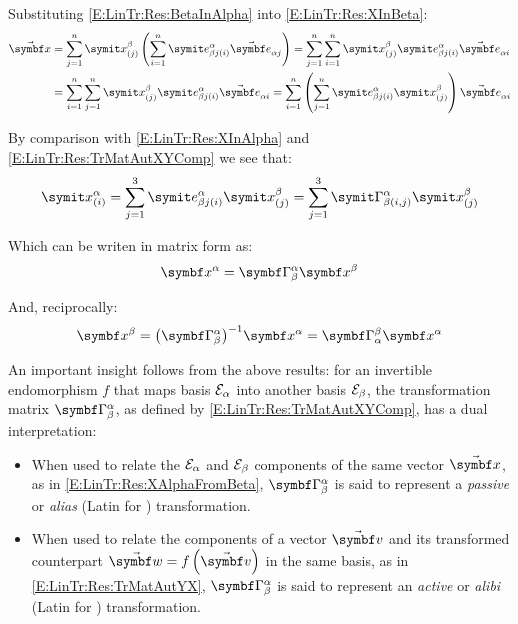Substituting \eqref{E:LinTr:Res:BetaInAlpha} into \eqref{E:LinTr:Res:XInBeta}:
\begin{equation}
\begin{split}
\vabs{x} 	&=\sum_{j=1}^{n} \cprj{x}{\beta}{j} \rndp{\sum_{i=1}^{n} \csubprj{\bv}{\beta j}{\alpha}{i} \vasub{\bv}{\alpha j} } = \sum_{j=1}^{n} \sum_{i=1}^{n}  \cprj{x}{\beta}{j} \csubprj{\bv}{\beta j}{\alpha}{i} \vasub{\bv}{\alpha i} \\
		&=\sum_{i=1}^{n} \sum_{j=1}^{n}  \cprj{x}{\beta}{j} \csubprj{\bv}{\beta j}{\alpha}{i} \vasub{\bv}{\alpha i}  = \sum_{i=1}^{n} \rndp{\sum_{j=1}^{n}  \csubprj{\bv}{\beta j}{\alpha}{i} \cprj{x}{\beta}{j} } \vasub{\bv}{\alpha i}
\end{split}
\end{equation}

By comparison with \eqref{E:LinTr:Res:XInAlpha} and \eqref{E:LinTr:Res:TrMatAutXYComp} we see that:
\begin{equation*}
\cprj{x}{\alpha}{i} = \sum_{j=1}^{3} \csubprj{\bv}{\beta j}{\alpha}{i}  \cprj{x}{\beta}{j} = \sum_{j=1}^{3} \cAut{\alpha}{\beta}{i,j} \cprj{x}{\beta}{j} 
\end{equation*}

Which can be writen in matrix form as:
\begin{equation} \label{E:LinTr:Res:XAlphaFromBeta}
\vprj{x}{\alpha} = \AutM{\alpha}{\beta} \vprj{x}{\beta}
\end{equation}

And, reciprocally:
\begin{equation} \label{E:LinTr:Res:XBetaFromAlpha}
\vprj{x}{\beta} = \invp{\AutM{\alpha}{\beta}} \vprj{x}{\alpha} = \AutM{\beta}{\alpha} \vprj{x}{\alpha}
\end{equation}

An important insight follows from the above results: for an invertible endomorphism $f$ that maps basis $\basis[\alpha]$ into another basis $\basis[\beta]$, the transformation matrix $\AutM{\alpha}{\beta}$, as defined by \eqref{E:LinTr:Res:TrMatAutXYComp}, has a dual interpretation:
\begin{itemize}
\item When used to relate the $\basis[\alpha]$ and $\basis[\beta]$ components of the same vector $\vabs{x}$, as in \eqref{E:LinTr:Res:XAlphaFromBeta}, $\AutM{\alpha}{\beta}$ is said to represent a \emph{passive} or \emph{alias} (Latin for ) transformation.
\item When used to relate the components of a vector $\vabs{v}$ and its transformed counterpart $\vabs{w}=f\rndp{\vabs{v}}$ in the same basis, as in \eqref{E:LinTr:Res:TrMatAutYX}, $\AutM{\alpha}{\beta}$ is said to represent an \emph{active} or \emph{alibi} (Latin for ) transformation.
\end{itemize}

